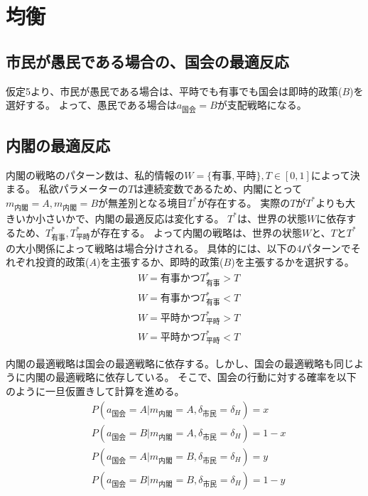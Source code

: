 \documentclass[main.tex]{subfiles}
\begin{document}
\section{均衡}


\subsection{市民が愚民である場合の、国会の最適反応}

仮定5より、市民が愚民である場合は、平時でも有事でも国会は即時的政策($B$)を選好する。
よって、愚民である場合は$a_{国会}=B$が支配戦略になる。


\subsection{内閣の最適反応}

内閣の戦略のパターン数は、私的情報の$W=\lbrace 有事, 平時\rbrace, T\in[0,1]$によって決まる。
私欲パラメーターの$T$は連続変数であるため、内閣にとって$m_{内閣}=A,m_{内閣}=B$が無差別となる境目$T^*$が存在する。
実際の$T$が$T^*$よりも大きいか小さいかで、内閣の最適反応は変化する。
$T^*$は、世界の状態$W$に依存するため、$T^*_{有事}, T^*_{平時}$が存在する。
よって内閣の戦略は、世界の状態$W$と、$T$と$T^*$の大小関係によって戦略は場合分けされる。
具体的には、以下の4パターンでそれぞれ投資的政策($A$)を主張するか、即時的政策($B$)を主張するかを選択する。
\begin{align*}
    & W=有事 かつ T^*_{有事}>T  \\
    & W=有事 かつ T^*_{有事}<T  \\
    & W=平時 かつ T^*_{平時}>T  \\
    & W=平時 かつ T^*_{平時}<T  
\end{align*}



内閣の最適戦略は国会の最適戦略に依存する。しかし、国会の最適戦略も同じように内閣の最適戦略に依存している。
そこで、国会の行動に対する確率を以下のように一旦仮置きして計算を進める。
\begin{align*}
    & P(a_{国会} = A| m_{内閣} = A, \delta_{市民} = \delta_H ) = x \\
    & P(a_{国会} = B| m_{内閣} = A, \delta_{市民} = \delta_H ) = 1-x \\
    & P(a_{国会} = A| m_{内閣} = B, \delta_{市民} = \delta_H ) = y \\
    & P(a_{国会} = B| m_{内閣} = B, \delta_{市民} = \delta_H ) = 1-y
\end{align*}
\end{document}

